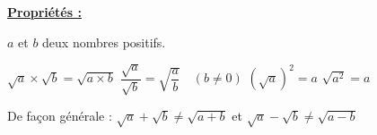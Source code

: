 \documentclass[12pt]{article}
\begin{document}
\vspace{10pt}
\begin{mdframed}[
    linewidth=1pt,
    roundcorner=5pt,
    linecolor=Red,
    innertopmargin=10pt,
    innerbottommargin=0pt
]
{\color{red}
\textbf{\underline{Propriétés :}}

\vspace{5pt}
$a$ et $b$ deux nombres positifs.

\begin{center}
    $\sqrt{a} \times \sqrt{b} = \sqrt{a \times b}$ \hspace{1cm} 
    $\dfrac{\sqrt{a}}{\sqrt{b}} = \sqrt{\dfrac{a}{b}} \quad (b \neq 0)$ \hspace{1cm}
    $(\sqrt{a})^2 = a$ \hspace{1cm}
    $\sqrt{a^2} = a$
\end{center}

}
\end{mdframed}

{\color{red}\selectfont{}\relax} De façon générale : 
$\sqrt{a} + \sqrt{b} \neq \sqrt{a + b}$ \hspace{1cm} et \hspace{1cm} $\sqrt{a} - \sqrt{b} \neq \sqrt{a-b}$


\vspace{10pt}
\end{document}
